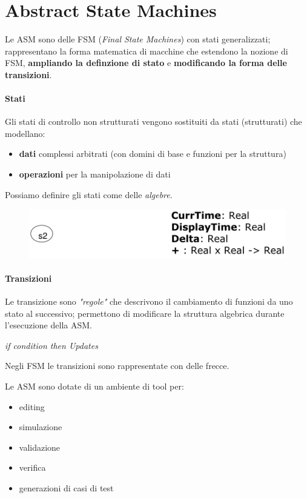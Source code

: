 \chapter{Abstract State Machines}

Le ASM sono delle FSM (\textit{Final State Machines}) con stati generalizzati; rappresentano la forma 
matematica di macchine che estendono la nozione di FSM, \textbf{ampliando la definzione di stato} 
e \textbf{modificando la forma delle transizioni}.

\subsubsection{Stati}
Gli stati di controllo non strutturati vengono sostituiti da stati (strutturati) che 
modellano:
\begin{itemize}
    \item \textbf{dati} complessi arbitrati (con domini di base e funzioni per la struttura)
    \item \textbf{operazioni} per la manipolazione di dati
\end{itemize}

\noindent Possiamo definire gli stati come delle \textit{algebre}.

\begin{figure}[H]
    \centering
    \includegraphics[width=0.8\linewidth]{chapters/1-asm/images/stati.png}
\end{figure}

\subsubsection{Transizioni}
Le transizione sono \textit{"regole"} che descrivono il cambiamento 
di funzioni da uno stato al successivo; permettono di modificare la 
struttura algebrica durante l'esecuzione della ASM.

\begin{center}
    \textit{if condition then Updates}
\end{center}

\noindent Negli FSM le transizioni sono rappresentate con delle frecce.

\newpage
Le ASM sono dotate di un ambiente di tool per:
\begin{itemize}
    \item editing
    \item simulazione
    \item validazione 
    \item verifica
    \item generazioni di casi di test
\end{itemize}

